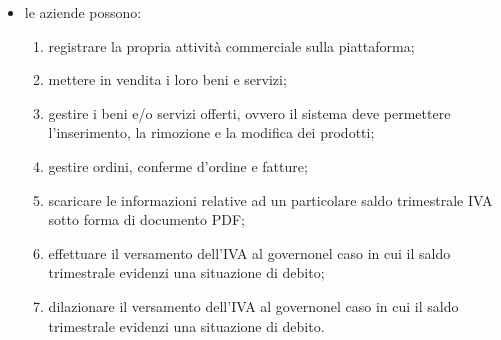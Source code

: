 \begin{itemize}
\begin{enumerate}[label=\alph*.]
		\begin{itemize}
			\item \textbf{deposito dei beni}: il cliente, durante il procedimento di acquisto, versa la somma dovuta nella piattaforma, dove verrà momentaneamente trattenuta. Il cliente riceve una conferma d'ordine\glosp nella sezione apposita del proprio account, e l'ordine viene aggiunto alle vendite in attesa di conferma nella sezione apposita dell'account dell'azienda-venditrice. La vera fattura conterrà gli stessi dati della conferma d'ordine\glo, ma verrà compilata all'approvazione di quest'ultima, per poter riportare la data corretta. La compilazione sarà eseguita dal sistema, che sta agendo da garante nel meccanismo di escrow\glo, ed è attualmente in possesso di entrambi gli oggetti della transazione/scambio;
			\item \textbf{riscatto beni}: all'approvazione, esplicita o automatica, della conferma d'ordine da parte del cliente, esso riceve la fattura, mentre l'azienda-venditrice riceve i soldi trattenuti dal sistema e può accedere alla fattura a sua volta.
		\end{itemize}
		Questo sistema è atto a garantire che ad ogni ordine il cliente riceva la fattura per dimostrare l'acquisto effettuato, e che l'azienda-venditrice riceva il pagamento. Con l'adozione di tale meccanismo viene semplificata la gestione dell'IVA, in quanto tutte le fatture emesse sono state approvate, e quindi da considerarsi prive di errori. 
	\end{enumerate}
	\item le aziende possono:
	\begin{enumerate}[label=\alph*.]
		\item registrare la propria attività commerciale sulla piattaforma;
		\item mettere in vendita i loro beni e servizi;
		\item gestire i beni e/o servizi offerti, ovvero il sistema deve permettere l'inserimento, la rimozione e la modifica dei prodotti;
		\item gestire ordini, conferme d'ordine e fatture;
		
		\item scaricare le informazioni relative ad un particolare saldo trimestrale IVA  sotto forma di documento PDF;
		\item effettuare il versamento dell'IVA al governo\glosp nel caso in cui il saldo trimestrale evidenzi una situazione di debito;
		\item dilazionare il versamento dell'IVA al governo\glosp nel caso in cui il saldo trimestrale evidenzi una situazione di debito.
	\end{enumerate}

\end{itemize}
